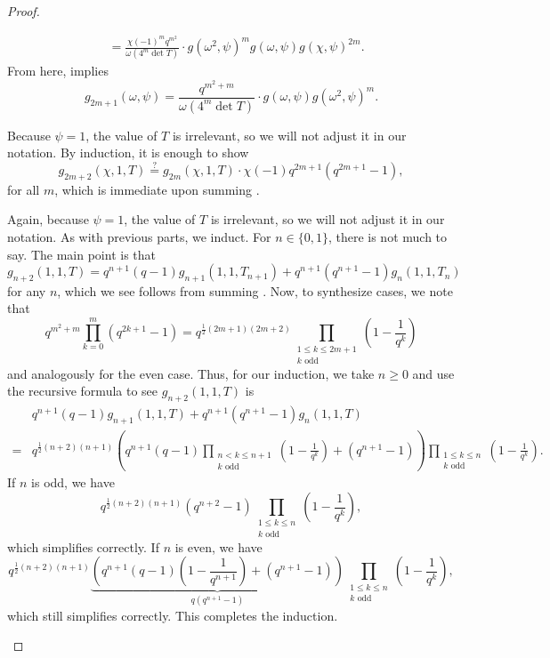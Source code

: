 \begin{proof}
\begin{listalph}
\begin{itemize}
\begin{align*}
                &= \frac{\chi(-1)^mq^{m^2}}{\omega(4^m\det T)}\cdot g\left(\omega^2,\psi\right)^mg(\omega,\psi)g(\chi,\psi)^{2m}.
            \end{align*}
            From here,  implies
            \[g_{2m+1}(\omega,\psi)=\frac{q^{m^2+m}}{\omega(4^m\det T)}\cdot g(\omega,\psi)g\left(\omega^2,\psi\right)^m.\]
        \end{itemize}
        \item Because $\psi=1$, the value of $T$ is irrelevant, so we will not adjust it in our notation. By induction, it is enough to show
        \[g_{2m+2}(\chi,1,T)\stackrel?=g_{2m}(\chi,1,T)\cdot\chi(-1)q^{2m+1}\left(q^{2m+1}-1\right),\]
        for all $m$, which is immediate upon summing .
        \item Again, because $\psi=1$, the value of $T$ is irrelevant, so we will not adjust it in our notation. As with previous parts, we induct. For $n\in\{0,1\}$, there is not much to say. The main point is that
        \[g_{n+2}(1,1,T)=q^{n+1}(q-1)g_{n+1}(1,1,T_{n+1})+q^{n+1}\left(q^{n+1}-1\right)g_n(1,1,T_n)\]
        for any $n$, which we see follows from summing . Now, to synthesize cases, we note that
        \[q^{m^2+m}\prod_{k=0}^{m}\left(q^{2k+1}-1\right)=q^{\frac12(2m+1)(2m+2)}\prod_{\substack{1\le k\le2m+1\\k\text{ odd}}}\left(1-\frac1{q^k}\right)\]
        and analogously for the even case. Thus, for our induction, we take $n\ge0$ and use the recursive formula to see $g_{n+2}(1,1,T)$ is
        \begin{align*}
            & q^{n+1}(q-1)g_{n+1}(1,1,T)+q^{n+1}\left(q^{n+1}-1\right)g_n(1,1,T) \\
            ={}& q^{\frac12(n+2)(n+1)}\left(q^{n+1}(q-1)\prod_{\substack{n<k\le n+1\\k\text{ odd}}}\left(1-\frac1{q^k}\right)+\left(q^{n+1}-1\right)\right)\prod_{\substack{1\le k\le n\\k\text{ odd}}}\left(1-\frac1{q^k}\right).
        \end{align*}
        If $n$ is odd, we have
        \[q^{\frac12(n+2)(n+1)}\left(q^{n+2}-1\right)\prod_{\substack{1\le k\le n\\k\text{ odd}}}\left(1-\frac1{q^k}\right),\]
        which simplifies correctly. If $n$ is even, we have
        \[q^{\frac12(n+2)(n+1)}\underbrace{\left(q^{n+1}(q-1)\left(1-\frac1{q^{n+1}}\right)+\left(q^{n+1}-1\right)\right)}_{q\left(q^{n+1}-1\right)}\prod_{\substack{1\le k\le n\\k\text{ odd}}}\left(1-\frac1{q^k}\right),\]
        which still simplifies correctly. This completes the induction.
        \qedhere
    \end{listalph}
\end{proof}
